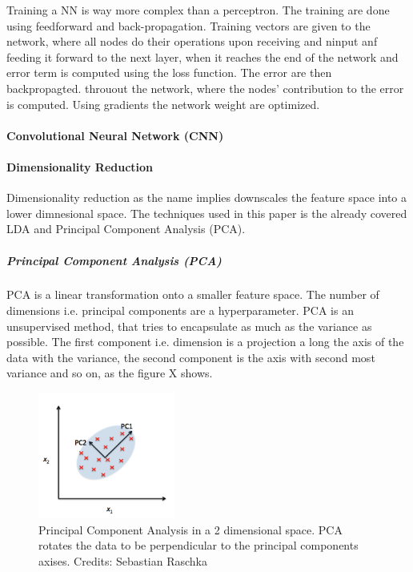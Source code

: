 Training a NN is way more complex than a perceptron. The training are done using feedforward and back-propagation. Training vectors are given to the network, where all nodes do their operations upon receiving and ninput anf feeding it forward to the next layer, when it reaches the end of the network and error term is computed using the loss function. The error are then backpropagted. throuout the network, where the nodes' contribution to the error is computed. Using gradients the network weight are optimized. 

\paragraph{Convolutional Neural Network (CNN)}

\paragraph{Dimensionality Reduction}

Dimensionality reduction as the name implies downscales the feature space into a lower dimnesional space. The techniques used in this paper is the already covered LDA and Principal Component Analysis (PCA).

\subparagraph{Principal Component Analysis (PCA)}

PCA is a linear transformation onto a smaller feature space. The number of dimensions i.e. principal components are a hyperparameter. PCA is an unsupervised method, that tries to encapsulate as much as the variance as possible. The first component i.e. dimension is a projection a long the axis of the data with the variance, the second component is the axis with second most variance and so on, as the figure X shows.

\begin{figure}[H]
    \centering
    \includegraphics[width=0.4\textwidth]{figures/pca.png}
    \caption[]{Principal Component Analysis in a 2 dimensional space. PCA rotates the data to be perpendicular to the principal components axises. Credits: Sebastian Raschka}
    \label{fig:pca}
\end{figure}

